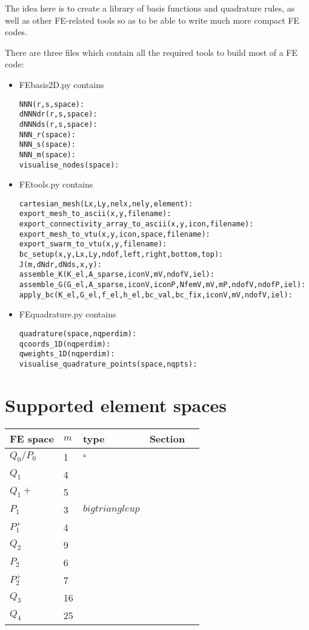 
The idea here is to create a library of basis functions and quadrature rules, as well as 
other FE-related tools so as to be able to write much more compact FE codes. 

There are three files which contain all the required tools to build most of a FE code:

\begin{itemize}

\item {\pythonfile FEbasis2D.py} contains 
\begin{lstlisting}
NNN(r,s,space):
dNNNdr(r,s,space):
dNNNds(r,s,space):
NNN_r(space):
NNN_s(space):
NNN_m(space):
visualise_nodes(space):
\end{lstlisting}



\item {\pythonfile FEtools.py} contains

\begin{lstlisting}
cartesian_mesh(Lx,Ly,nelx,nely,element):
export_mesh_to_ascii(x,y,filename):
export_connectivity_array_to_ascii(x,y,icon,filename):
export_mesh_to_vtu(x,y,icon,space,filename):
export_swarm_to_vtu(x,y,filename):
bc_setup(x,y,Lx,Ly,ndof,left,right,bottom,top):
J(m,dNdr,dNds,x,y):
assemble_K(K_el,A_sparse,iconV,mV,ndofV,iel):
assemble_G(G_el,A_sparse,iconV,iconP,NfemV,mV,mP,ndofV,ndofP,iel):
apply_bc(K_el,G_el,f_el,h_el,bc_val,bc_fix,iconV,mV,ndofV,iel):
\end{lstlisting}

\item {\pythonfile FEquadrature.py} contains

\begin{lstlisting}
quadrature(space,nqperdim):
qcoords_1D(nqperdim):
qweights_1D(nqperdim):
visualise_quadrature_points(space,nqpts):
\end{lstlisting}

\end{itemize}

\section*{Supported element spaces}

\begin{tabular}{lllll}
\hline
FE space  & $m$ & type  & Section  \\
\hline
\hline
$Q_0/P_0$ & 1   & $\square$ & \\
$Q_1$     & 4   &       & \\
$Q_1+$    & 5   &       & \\
$P_1$     & 3   & $bigtriangleup$ & \\
$P_1^+$   & 4   &   &    \\
$Q_2$     & 9   &   &    \\
$P_2$     & 6   &   &    \\
$P_2^+$   & 7   &   &    \\
$Q_3$     & 16  &   &    \\
$Q_4$     & 25  &   &    \\
\hline
\end{tabular}


